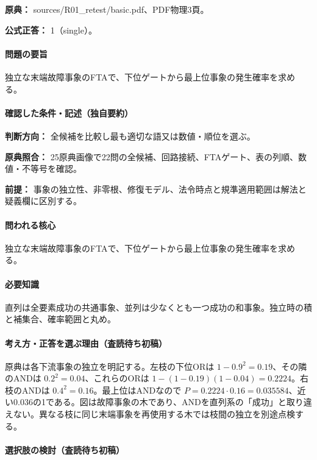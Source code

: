\noindent\textbf{原典：} sources/R01\_retest/basic.pdf、PDF物理3頁。

\textbf{公式正答：} 1（single）。

\paragraph{問題の要旨} 独立な末端故障事象のFTAで、下位ゲートから最上位事象の発生確率を求める。

\paragraph{確認した条件・記述（独自要約）}\mbox{}\par

\noindent\textbf{判断方向：} 全候補を比較し最も適切な語又は数値・順位を選ぶ。\par

\noindent\textbf{原典照合：} 25原典画像で22問の全候補、回路接続、FTAゲート、表の列順、数値・不等号を確認。\par

\noindent\textbf{前提：} 事象の独立性、非零根、修復モデル、法令時点と規準適用範囲は解法と疑義欄に区別する。\par

\paragraph{問われる核心} 独立な末端故障事象のFTAで、下位ゲートから最上位事象の発生確率を求める。

\paragraph{必要知識} 直列は全要素成功の共通事象、並列は少なくとも一つ成功の和事象。独立時の積と補集合、確率範囲と丸め。

\paragraph{考え方・正答を選ぶ理由（査読待ち初稿）} 原典は各下流事象の独立を明記する。左枝の下位ORは \(1-0.9^2=0.19\)、その隣のANDは \(0.2^2=0.04\)、これらのORは \(1-(1-0.19)(1-0.04)=0.2224\)。右枝のANDは \(0.4^2=0.16\)。最上位はANDなので \(P=0.2224\cdot0.16=0.035584\)、近い0.036の1である。図は故障事象の木であり、ANDを直列系の「成功」と取り違えない。異なる枝に同じ末端事象を再使用する木では枝間の独立を別途点検する。

\paragraph{選択肢の検討（査読待ち初稿）}\mbox{}\par

